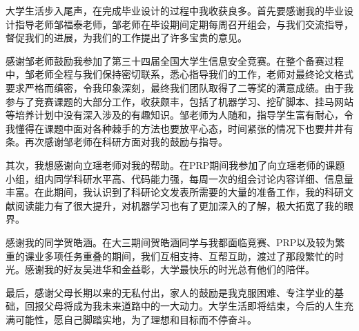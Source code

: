 
\begin{acknowledgements}

大学生活步入尾声，在完成毕业设计的过程中我收获良多。首先要感谢我的毕业设计指导老师邹福泰老师，邹老师在毕设期间定期每周召开组会，与我们交流指导，督促我们的进展，为我们的工作提出了许多宝贵的意见。


感谢邹老师鼓励我参加了第三十四届全国大学生信息安全竞赛。在整个备赛过程中，邹老师全程与我们保持密切联系，悉心指导我们的工作，老师对最终论文格式要求严格而缜密，令我印象深刻，最终我们团队取得了二等奖的满意成绩。由于我参与了竞赛课题的大部分工作，收获颇丰，包括了机器学习、挖矿脚本、挂马网站等培养计划中没有深入涉及的有趣知识。邹老师为人随和，指导学生富有耐心，令我懂得在课题中面对各种棘手的方法也要放平心态，时间紧张的情况下也要井井有条。再次感谢邹老师在科研方面对我的鼓励与指导。


其次，我想感谢向立瑶老师对我的帮助。在PRP期间我参加了向立瑶老师的课题小组，组内同学科研水平高、代码能力强，每周一次的组会讨论内容详细、信息量丰富。在此期间，我认识到了科研论文发表所需要的大量的准备工作，我的科研文献阅读能力有了很大提升，对机器学习也有了更加深入的了解，极大拓宽了我的眼界。


感谢我的同学贺皓涵。在大三期间贺皓涵同学与我都面临竞赛、PRP以及较为繁重的课业多项任务重叠的期间，我们互相支持、互帮互助，渡过了那段繁忙的时光。感谢我的好友吴进华和金益彰，大学最快乐的时光总有他们的陪伴。


最后，感谢父母长期以来的无私付出，家人的鼓励是我克服困难、专注学业的基础，回报父母将成为我未来道路中的一大动力。大学生活即将结束，今后的人生充满可能性，愿自己脚踏实地，为了理想和目标而不停奋斗。

\end{acknowledgements}
